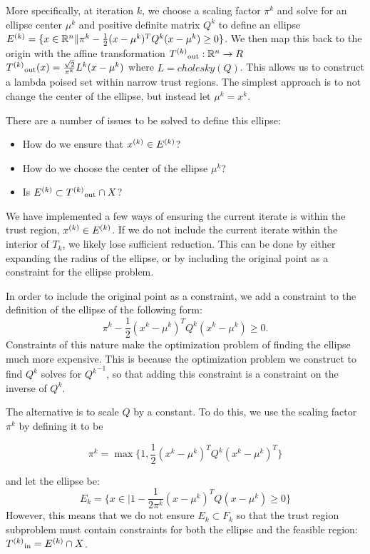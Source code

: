 More specifically, at iteration $k$, we choose a scaling factor $\pi^k$ and solve for an ellipse center $\mu^k$ and positive definite matrix $Q^k$ to define an ellipse
$ {E^{(k)}} = \{x \in \mathbb R^n \| \pi^k - \frac 1 2 (x - \mu^{k})^TQ^{k}(x - \mu^{k}) \ge 0 \}$.
We then map this back to the origin with the affine transformation ${T^{(k)}}_{\text{out}} : \mathbb R^n \to R$ ${T^{(k)}}_{\text{out}}(x) = \frac {\sqrt{2}}{\pi^k} L^k(x-\mu^k)$ where $L = cholesky(Q)$.
This allows us to construct a lambda poised set within narrow trust regions.
The simplest approach is to not change the center of the ellipse, but instead let $\mu^k = x^k$.

There are a number of issues to be solved to define this ellipse:
\begin{itemize}
\item How do we ensure that ${x}^{(k)} \in {E^{(k)}}$?
\item How do we choose the center of the ellipse $\mu^k$?
\item Is $ {E^{(k)}} \subset {T^{(k)}}_{\text{out}} \cap X$?
\end{itemize}

We have implemented a few ways of ensuring the current iterate is within the trust region, ${x}^{(k)} \in {E^{(k)}}$.
If we do not include the current iterate within the interior of $T_{k}$, we likely lose sufficient reduction.
This can be done by either expanding the radius of the ellipse, or by including the original point as a constraint for the ellipse problem.


In order to include the original point as a constraint, we add a constraint to the definition of the ellipse of the following form:
$$ \pi^k - \frac 1 2 (x^k - \mu^{k})^TQ^{k}(x^k - \mu^{k}) \ge 0. $$
Constraints of this nature make the optimization problem of finding the ellipse much more expensive.
This is because the optimization problem we construct to find $Q^k$ solves for ${Q^k}^{-1}$, so that adding this constraint is a constraint on the inverse of $Q^k$.


The alternative is to scale $Q$ by a constant.
To do this, we use the scaling factor $\pi^k$ by defining it to be

$$\pi^k = \max \{1, \frac 1 {2} (x^{k} - \mu^{k})^T Q^k (x^{k} - \mu^{k})^T \}$$

and let the ellipse be:
$$E_k = \{x \in \mathbb | 1 - \frac 1 {2\pi^k} (x - \mu^{k})^T Q (x - \mu^{k}) \ge 0\} $$
However, this means that we do not ensure $E_k \subset F_k$ so that the trust region subproblem must contain constraints for both the ellipse and the feasible region: ${T^{(k)}}_{\text{in}} = {E^{(k)}} \cap X$.

